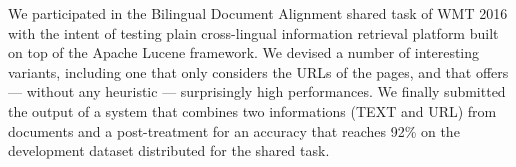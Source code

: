 We participated in the Bilingual Document Alignment shared task of WMT 2016 with the intent of testing plain cross-lingual information retrieval platform built on top of the Apache Lucene framework. We devised a number of interesting variants, including one that only considers the URLs of the pages, and that offers --- without any heuristic ---  surprisingly high performances. We finally submitted the output of a system that combines two informations (TEXT and URL) from documents and a post-treatment for an accuracy that reaches 92\% on the development dataset distributed for the shared task.
